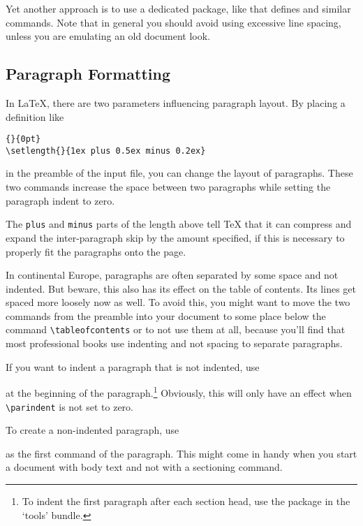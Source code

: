 Yet another approach is to use a dedicated package, like  that
defines  and similar commands. Note that in general you
should avoid using excessive line spacing, unless you are emulating an old
document look.

\subsection{Paragraph Formatting}\label{parsp}

In \LaTeX{}, there are two parameters influencing paragraph layout.
By placing a definition like
\begin{code}
\verb|{|\verb|}{0pt}| \\
\verb|\setlength{|\verb|}{1ex plus 0.5ex minus 0.2ex}|
\end{code}
in the preamble of the input file, you can change the layout of
paragraphs. These two commands increase the space between two paragraphs
while setting the paragraph indent to zero.

The \texttt{plus} and \texttt{minus} parts of the length above tell
\TeX{} that it can compress and expand the inter-paragraph skip by the
amount specified, if this is necessary to properly fit the paragraphs
onto the page.

In continental Europe,
paragraphs are often separated by some space and not indented. But
beware, this also has its effect on the table of contents. Its lines
get spaced more loosely now as well. To avoid this, you might want to
move the two commands from the preamble into your document to some
place below the command \verb|\tableofcontents| or to not use them at all,
because you'll find that most professional books use indenting and not
spacing to separate paragraphs.

If you want to indent a paragraph that is not indented, use
\begin{lscommand}
\end{lscommand}
\noindent at the beginning of the paragraph.\footnote{To indent the first paragraph after each section head, use
  the  package in the `tools' bundle.} Obviously,
this will only have an effect when \verb|\parindent| is not set to
zero.

To create a non-indented paragraph, use
\begin{lscommand}
\end{lscommand}
\noindent as the first command of the paragraph. This might come in handy when
you start a document with body text and not with a sectioning command.

